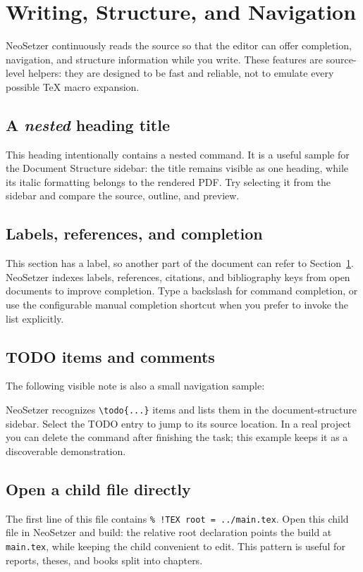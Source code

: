 
\section{Writing, Structure, and Navigation}
\label{sec:writing-navigation}

NeoSetzer continuously reads the source so that the editor can offer
completion, navigation, and structure information while you write. These
features are source-level helpers: they are designed to be fast and reliable,
not to emulate every possible TeX macro expansion.

\subsection{A \textit{nested} heading title}
\label{sec:writing-navigation:nested-title}

This heading intentionally contains a nested command. It is a useful sample
for the Document Structure sidebar: the title remains visible as one heading,
while its italic formatting belongs to the rendered PDF. Try selecting it from
the sidebar and compare the source, outline, and preview.

\subsection{Labels, references, and completion}
\label{sec:writing-navigation:labels}

This section has a label, so another part of the document can refer to
Section~\ref{sec:writing-navigation}. NeoSetzer indexes labels, references,
citations, and bibliography keys from open documents to improve completion.
Type a backslash for command completion, or use the configurable manual
completion shortcut when you prefer to invoke the list explicitly.

\subsection{TODO items and comments}
\label{sec:writing-navigation:todos}

The following visible note is also a small navigation sample:

NeoSetzer recognizes \texttt{\textbackslash todo\{...\}} items and lists them
in the document-structure sidebar. Select the TODO entry to jump to its source
location. In a real project you can delete the command after finishing the
task; this example keeps it as a discoverable demonstration.

\subsection{Open a child file directly}
\label{sec:writing-navigation:root}

The first line of this file contains \texttt{\% !TEX root = ../main.tex}.
Open this child file in NeoSetzer and build: the relative root declaration
points the build at \texttt{main.tex}, while keeping the child convenient to
edit. This pattern is useful for reports, theses, and books split into chapters.
